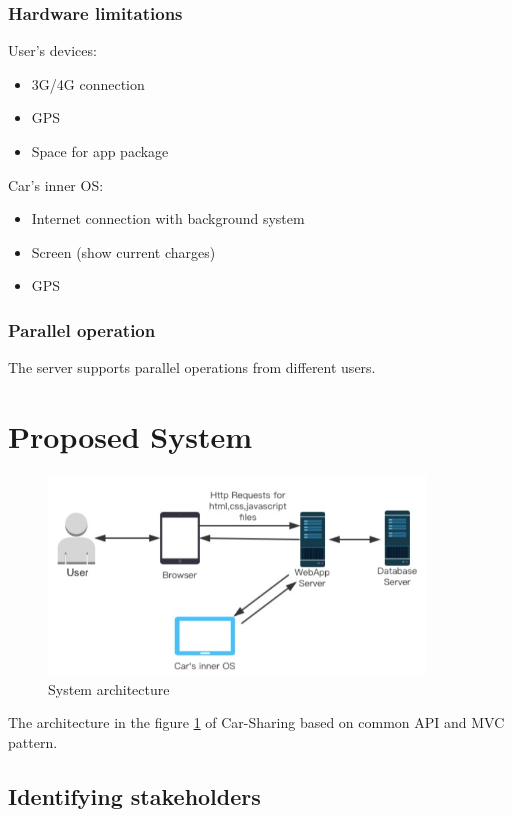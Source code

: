 \documentclass[12pt, letterpaper]{article}
\begin{document}
\subsubsection{Hardware limitations}
User’s devices: \\
\begin{itemize}
	\item 3G/4G connection
	\item GPS
	\item Space for app package
\end{itemize}
Car’s inner OS: \\
\begin{itemize}
	\item Internet connection with background system
	\item Screen (show current charges)
	\item GPS
\end{itemize}

\subsubsection{Parallel operation}
The server supports parallel operations from different users.
\newpage

\section{Proposed System}

\begin{figure}[h]
\centering
\includegraphics[width=10cm]{architecture.jpg}
\caption{System architecture}
\label{fig:arch}
\end{figure}

The architecture in the figure \ref{fig:arch} of Car-Sharing based on common API and MVC pattern.



\subsection{Identifying stakeholders}
\end{document}
